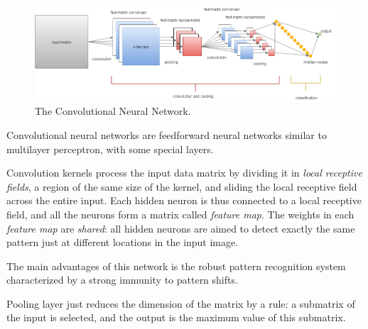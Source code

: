 \begin{enumerate}
	\begin{figure}
		\centering
		\includegraphics[width=0.9\columnwidth]{img/CNN}
		\caption{The Convolutional Neural Network.}
	\end{figure}
	
	
	Convolutional neural networks are feedforward neural networks similar to multilayer perceptron, with some special layers.
	
	
	
	
	
	Convolution kernels process the input data matrix by dividing it in \textit{local receptive fields}, a region of the same size of the kernel, and sliding the local receptive field across the entire input.
	Each hidden neuron is thus connected to a local receptive field, and all the neurons form a matrix called \textit{feature map}.
	The weights in each \textit{feature map} are \textit{shared}: all hidden neurons are aimed to detect exactly the same pattern just at different locations in the input image. 
	
	The main advantages of this network is the robust pattern recognition system characterized by a strong immunity to pattern shifts.
	
	Pooling layer just reduces the dimension of the matrix by a rule: a submatrix of the input is selected, and the output is the maximum value of this submatrix.
	

\end{enumerate}
